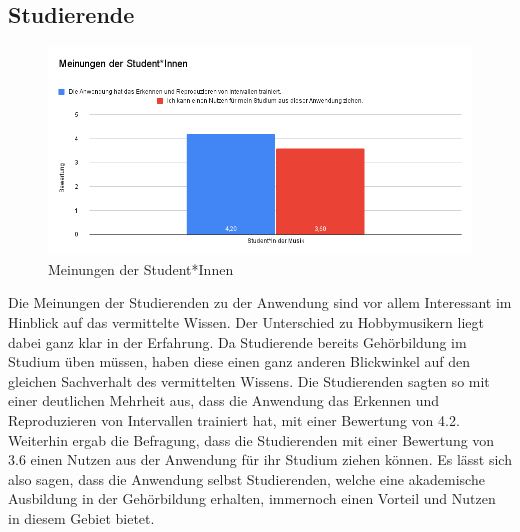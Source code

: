 \subsection*{Studierende}
\begin{figure}[H]
    \centering
    \includegraphics[width=1\textwidth]{Bilder/eval-meinungenStudis.png}
    \caption{Meinungen der Student*Innen}
\end{figure}
Die Meinungen der Studierenden zu der Anwendung sind vor allem Interessant im Hinblick auf das vermittelte Wissen. Der Unterschied zu Hobbymusikern liegt dabei ganz klar in der Erfahrung. Da Studierende bereits Gehörbildung im Studium üben müssen, haben diese einen ganz anderen Blickwinkel auf den gleichen Sachverhalt des vermittelten Wissens. Die Studierenden sagten so mit einer deutlichen Mehrheit aus, dass die Anwendung das Erkennen und Reproduzieren von Intervallen trainiert hat, mit einer Bewertung von 4.2. Weiterhin ergab die Befragung, dass die Studierenden mit einer Bewertung von 3.6 einen Nutzen aus der Anwendung für ihr Studium ziehen können. Es lässt sich also sagen, dass die Anwendung selbst Studierenden, welche eine akademische Ausbildung in der Gehörbildung erhalten, immernoch einen Vorteil und Nutzen in diesem Gebiet bietet. 


